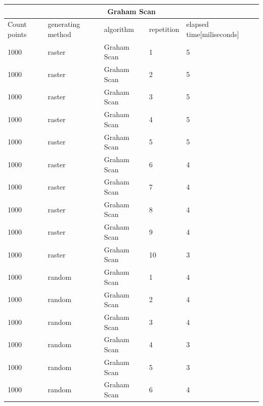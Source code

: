 \documentclass[12pt]{article}
\begin{document}
\begin{longtable}{|l|l|l|l|l|}
\hline
\multicolumn{5}{|c|}{\textbf{Graham Scan}}                                                  \\ \hline
Count points & generating method & algorithm   & repetition & elapsed time{[}miliseconds{]} \\ \hline
1000         & raster            & Graham Scan & 1          & 5                             \\ \hline
1000         & raster            & Graham Scan & 2          & 5                             \\ \hline
1000         & raster            & Graham Scan & 3          & 5                             \\ \hline
1000         & raster            & Graham Scan & 4          & 5                             \\ \hline
1000         & raster            & Graham Scan & 5          & 5                             \\ \hline
1000         & raster            & Graham Scan & 6          & 4                             \\ \hline
1000         & raster            & Graham Scan & 7          & 4                             \\ \hline
1000         & raster            & Graham Scan & 8          & 4                             \\ \hline
1000         & raster            & Graham Scan & 9          & 4                             \\ \hline
1000         & raster            & Graham Scan & 10         & 3                             \\ \hline
1000         & random            & Graham Scan & 1          & 4                             \\ \hline
1000         & random            & Graham Scan & 2          & 4                             \\ \hline
1000         & random            & Graham Scan & 3          & 4                             \\ \hline
1000         & random            & Graham Scan & 4          & 3                             \\ \hline
1000         & random            & Graham Scan & 5          & 3                             \\ \hline
1000         & random            & Graham Scan & 6          & 4                             \\ \hline

\end{longtable}
\end{document}
